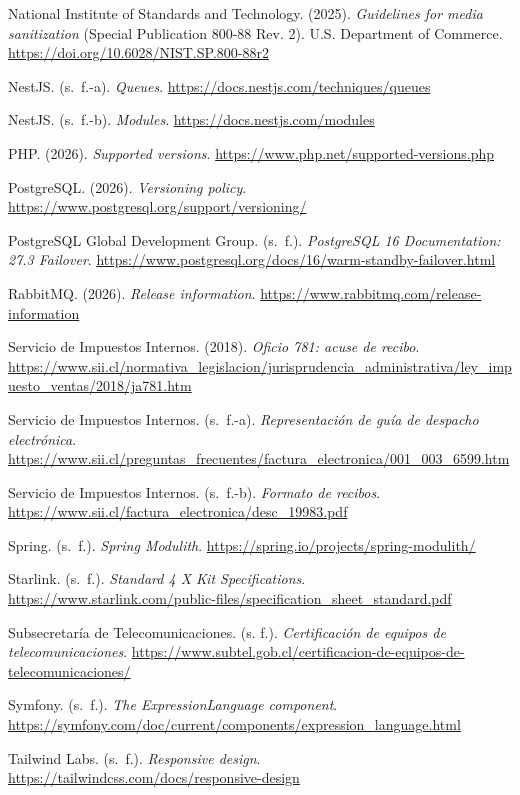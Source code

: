 \begin{list}{}{\setlength{\leftmargin}{1.27cm}\setlength{\itemindent}{-1.27cm}\setlength{\itemsep}{0.5\baselineskip}\raggedright}
\item National Institute of Standards and Technology. (2025). \textit{Guidelines for media sanitization} (Special Publication 800-88 Rev. 2). U.S. Department of Commerce. \url{https://doi.org/10.6028/NIST.SP.800-88r2}
\item NestJS. (s.~f.-a). \textit{Queues}. \url{https://docs.nestjs.com/techniques/queues}
\item NestJS. (s.~f.-b). \textit{Modules}. \url{https://docs.nestjs.com/modules}
\item PHP. (2026). \textit{Supported versions}. \url{https://www.php.net/supported-versions.php}
\item PostgreSQL. (2026). \textit{Versioning policy}. \url{https://www.postgresql.org/support/versioning/}
\item PostgreSQL Global Development Group. (s.~f.). \textit{PostgreSQL 16 Documentation: 27.3 Failover}. \url{https://www.postgresql.org/docs/16/warm-standby-failover.html}
\item RabbitMQ. (2026). \textit{Release information}. \url{https://www.rabbitmq.com/release-information}
\item Servicio de Impuestos Internos. (2018). \textit{Oficio 781: acuse de recibo}. \url{https://www.sii.cl/normativa_legislacion/jurisprudencia_administrativa/ley_impuesto_ventas/2018/ja781.htm}
\item Servicio de Impuestos Internos. (s.~f.-a). \textit{Representación de guía de despacho electrónica}. \url{https://www.sii.cl/preguntas_frecuentes/factura_electronica/001_003_6599.htm}
\item Servicio de Impuestos Internos. (s.~f.-b). \textit{Formato de recibos}. \url{https://www.sii.cl/factura_electronica/desc_19983.pdf}
\item Spring. (s.~f.). \textit{Spring Modulith}. \url{https://spring.io/projects/spring-modulith/}
\item Starlink. (s.~f.). \textit{Standard 4 X Kit Specifications}. \url{https://www.starlink.com/public-files/specification_sheet_standard.pdf}
\item Subsecretaría de Telecomunicaciones. (s. f.). \textit{Certificación de equipos de telecomunicaciones}. \url{https://www.subtel.gob.cl/certificacion-de-equipos-de-telecomunicaciones/}
\item Symfony. (s.~f.). \textit{The ExpressionLanguage component}. \url{https://symfony.com/doc/current/components/expression_language.html}
\item Tailwind Labs. (s.~f.). \textit{Responsive design}. \url{https://tailwindcss.com/docs/responsive-design}

\end{list}
